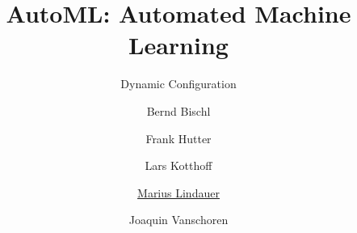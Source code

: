




\title[AutoML: Learning to Configure]{AutoML: Automated Machine Learning}
\subtitle{Dynamic Configuration}
\author[Marius Lindauer]{Bernd Bischl \and Frank Hutter \and Lars Kotthoff\newline \and \underline{Marius Lindauer} \and Joaquin Vanschoren}
\institute{}
\date{}





	
	\maketitle
	

